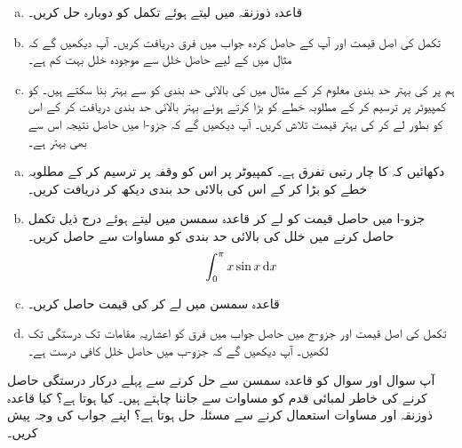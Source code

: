 \begin{enumerate}[a.]
\item
قاعدہ ذوزنقہ میں  لیتے ہوئے تکمل کو دوبارہ حل کریں۔
\item
تکمل کی اصل قیمت  اور آپ کے حاصل کردہ جواب میں فرق دریافت کریں۔ آپ دیکھیں گے کہ  مثال  میں کے لیے حاصل خلل  سے موجودہ خلل بہت کم ہے۔
\item
ہم   پر کی بہتر حد بندی معلوم کر کے  مثال  میں  کی بالائی حد بندی کو  سے بہتر بنا سکتے ہیں۔  کو کمپیوٹر پر ترسیم کر کے مطلوبہ خطے کو بڑا کرتے ہوئے بہتر بالائی حد بندی دریافت کر کے اس کو بطور  لے کر کی بہتر قیمت تلاش کریں۔ آپ دیکھیں گے کہ جزو-ا میں حاصل نتیجہ اس سے بھی بہتر ہے۔
\end{enumerate}
\begin{enumerate}[a.]
\item
دکھائیں کہ  کا چار  رتبی تفرق  ہے۔ کمپیوٹر پر اس کو وقفہ  پر ترسیم کر کے مطلوبہ خطے  کو بڑا کر کے اس کی بالائی حد بندی دیکھ کر دریافت کریں۔
\item
جزو-ا میں حاصل قیمت کو  لے کر قاعدہ سمسن میں  لیتے ہوئے  درج ذیل تکمل حاصل کرنے میں خلل کی بالائی حد بندی  کو  مساوات  سے حاصل کریں۔
\begin{align*}
\int_0^{\pi}x\sin x\dif x
\end{align*}
\item
قاعدہ سمسن میں  لے کر  کی قیمت حاصل کریں۔
\item
تکمل کی اصل قیمت  اور جزو-ج میں حاصل جواب میں فرق کو  اعشاریہ مقامات تک درستگی تک لکھیں۔ آپ دیکھیں گے کہ جزو-ب میں حاصل خلل کافی درست ہے۔
\end{enumerate}
آپ سوال  اور سوال  کو قاعدہ سمسن سے حل کرنے سے پہلے درکار درستگی حاصل کرنے کی خاطر لمبائی قدم  کو مساوات  سے جاننا چاہتے ہیں۔ کیا ہوتا ہے؟ کیا قاعدہ ذوزنقہ اور مساوات  استعمال کرنے سے مسئلہ حل ہوتا ہے؟ اپنے جواب کی وجہ پیش کریں۔  

